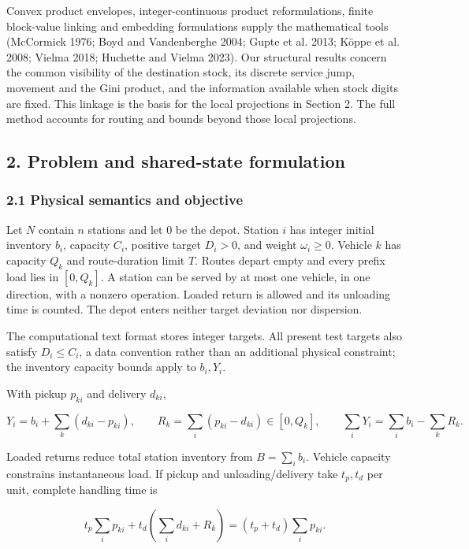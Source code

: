 \documentclass[
  american,
  11pt,
]{article}
\begin{document}
Convex product envelopes, integer-continuous product reformulations,
finite block-value linking and embedding formulations supply the
mathematical tools (McCormick 1976; Boyd and Vandenberghe 2004; Gupte et
al. 2013; Köppe et al. 2008; Vielma 2018; Huchette and Vielma 2023). Our
structural results concern the common visibility of the destination
stock, its discrete service jump, movement and the Gini product, and the
information available when stock digits are fixed. This linkage is the
basis for the local projections in Section 2. The full method accounts
for routing and bounds beyond those local projections.

\subsection{2. Problem and shared-state
formulation}\label{problem-and-shared-state-formulation}

\subsubsection{2.1 Physical semantics and
objective}\label{physical-semantics-and-objective}

Let \(N\) contain \(n\) stations and let \(0\) be the depot. Station
\(i\) has integer initial inventory \(b_i\), capacity \(C_i\), positive
target \(D_i>0\), and weight \(\omega_i\ge0\). Vehicle \(k\) has
capacity \(Q_k\) and route-duration limit \(T\). Routes depart empty and
every prefix load lies in \([0,Q_k]\). A station can be served by at
most one vehicle, in one direction, with a nonzero operation. Loaded
return is allowed and its unloading time is counted. The depot enters
neither target deviation nor dispersion.

The computational text format stores integer targets. All present test
targets also satisfy \(D_i\le C_i\), a data convention rather than an
additional physical constraint; the inventory capacity bounds apply to
\(b_i,Y_i\).

With pickup \(p_{ki}\) and delivery \(d_{ki}\),

\[
Y_i=b_i+\sum_k(d_{ki}-p_{ki}),\qquad
R_k=\sum_i(p_{ki}-d_{ki})\in[0,Q_k],\qquad
\sum_iY_i=\sum_i b_i-\sum_kR_k.
\]

Loaded returns reduce total station inventory from \(B=\sum_i b_i\).
Vehicle capacity constrains instantaneous load. If pickup and
unloading/delivery take \(t_p,t_d\) per unit, complete handling time is

\[
t_p\sum_i p_{ki}+t_d\left(\sum_i d_{ki}+R_k\right)
=(t_p+t_d)\sum_i p_{ki}.
\]
\end{document}
